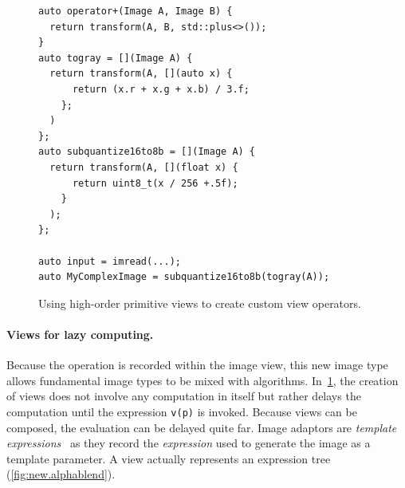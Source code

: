 \begin{figure}
  \begin{verbatim}
auto operator+(Image A, Image B) {
  return transform(A, B, std::plus<>());
}
auto togray = [](Image A) {
  return transform(A, [](auto x) {
      return (x.r + x.g + x.b) / 3.f;
    };
  )
};
auto subquantize16to8b = [](Image A) {
  return transform(A, [](float x) {
      return uint8_t(x / 256 +.5f);
    }
  );
};

auto input = imread(...);
auto MyComplexImage = subquantize16to8b(togray(A));
  \end{verbatim}

  \caption{Using high-order primitive views to create custom view operators.}
  \label{fig:view.highorder}
\end{figure}

\paragraph{Views for lazy computing.} Because the operation is recorded within the image view, this new image type
allows fundamental image types to be mixed with algorithms. In~\cref{fig:view.highorder}, the creation of views does not
involve any computation in itself but rather delays the computation until the expression \texttt{v(p)} is invoked.
Because views can be composed, the evaluation can be delayed quite far. Image adaptors are \emph{template
  expressions}~\parencite{veldhuizen.1995.expression,veldhuizen.2000.blitz} as they record the \emph{expression} used to
generate the image as a template parameter. A view actually represents an expression tree (\cref{fig:new.alphablend}).

